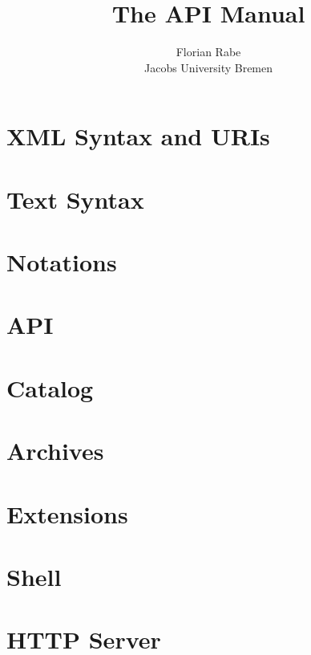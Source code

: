 \documentclass{article}
\title{The {\mmt} API Manual}
\author{Florian Rabe \\
Jacobs University Bremen}
\begin{document}
\maketitle


\section{{\mmt} XML Syntax and {\mmt} URIs}\label{sec:syntax}
  

\section{{\mmt} Text Syntax}\label{sec:syntax}
  

\section{Notations}\label{sec:notations}
  

\section{{\mmt} API}

\section{Catalog}\label{sec:catalog}
  

\section{Archives}\label{sec:archives}
  

\section{Extensions}\label{sec:extensions}
  

\section{Shell}\label{sec:shell}
  

\section{HTTP Server}\label{sec:http}
  




\end{document}

